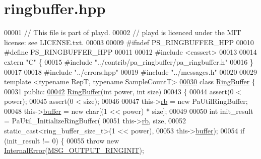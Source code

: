 \hypertarget{ringbuffer_8hpp_source}{\section{ringbuffer.\+hpp}
\label{ringbuffer_8hpp_source}
}

\begin{DoxyCode}
00001 \textcolor{comment}{// This file is part of playd.}
00002 \textcolor{comment}{// playd is licenced under the MIT license: see LICENSE.txt.}
00003 
00009 \textcolor{preprocessor}{#ifndef PS\_RINGBUFFER\_HPP}
00010 \textcolor{preprocessor}{#define PS\_RINGBUFFER\_HPP}
00011 
00012 \textcolor{preprocessor}{#include <cassert>}
00013 
00014 \textcolor{keyword}{extern} \textcolor{stringliteral}{"C"} \{
00015 \textcolor{preprocessor}{#include "../contrib/pa\_ringbuffer/pa\_ringbuffer.h"}
00016 \}
00017 
00018 \textcolor{preprocessor}{#include "../errors.hpp"}
00019 \textcolor{preprocessor}{#include "../messages.h"}
00020 
00029 \textcolor{keyword}{template} <\textcolor{keyword}{typename} RepT, \textcolor{keyword}{typename} SampleCountT>
\hypertarget{ringbuffer_8hpp_source_l00030}{}\hyperlink{classRingBuffer}{00030} \textcolor{keyword}{class }\hyperlink{classRingBuffer}{RingBuffer} \{
00031 \textcolor{keyword}{public}:
\hypertarget{ringbuffer_8hpp_source_l00042}{}\hyperlink{classRingBuffer_a2f831ec4941885db960a833cb807465e}{00042}     \hyperlink{classRingBuffer_a2f831ec4941885db960a833cb807465e}{RingBuffer}(\textcolor{keywordtype}{int} power, \textcolor{keywordtype}{int} size)
00043     \{
00044         assert(0 < power);
00045         assert(0 < size);
00046 
00047         this->\hyperlink{classRingBuffer_a10985ec171bcc15c1301dc74fcb6e7b2}{rb} = \textcolor{keyword}{new} PaUtilRingBuffer;
00048         this->\hyperlink{classRingBuffer_a09103853af3302b27d2bbd46f1dfbe87}{buffer} = \textcolor{keyword}{new} \textcolor{keywordtype}{char}[(1 << power) * size];
00049 
00050         \textcolor{keywordtype}{int} init\_result = PaUtil\_InitializeRingBuffer(
00051                         this->\hyperlink{classRingBuffer_a10985ec171bcc15c1301dc74fcb6e7b2}{rb}, size,
00052                         static\_cast<ring\_buffer\_size\_t>(1 << power),
00053                         this->\hyperlink{classRingBuffer_a09103853af3302b27d2bbd46f1dfbe87}{buffer});
00054         \textcolor{keywordflow}{if} (init\_result != 0) \{
00055             \textcolor{keywordflow}{throw} \textcolor{keyword}{new} \hyperlink{classInternalError}{InternalError}(\hyperlink{messages_8h_a3bf0477dded19418d7ecac95aeae8856}{MSG\_OUTPUT\_RINGINIT});

\end{DoxyCode}
